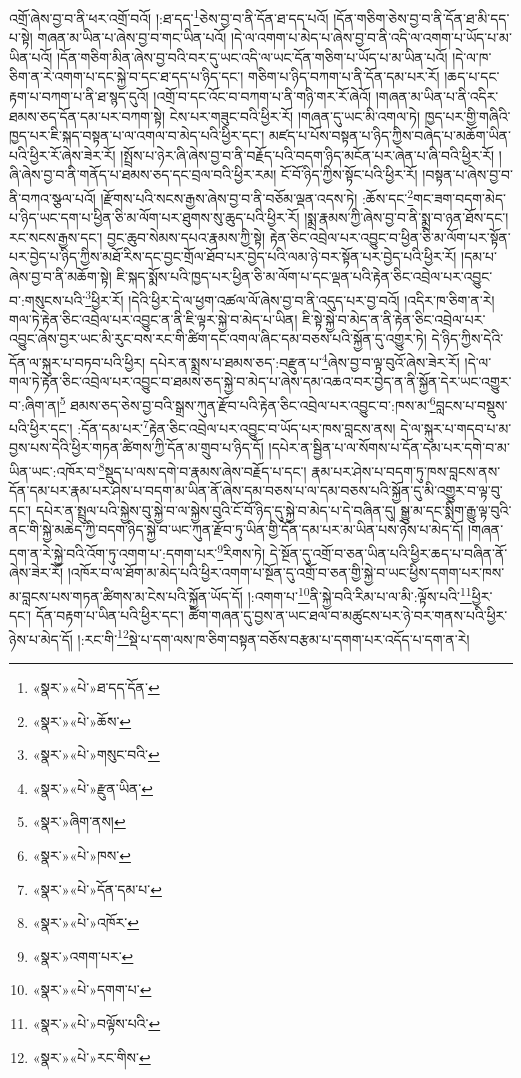འགྲོ་ཞེས་བྱ་བ་ནི་ཕར་འགྲོ་བའོ། །:ཐ་དད་\footnote{«སྣར་»«པེ་»ཐ་དད་དོན་}ཅེས་བྱ་བ་ནི་དོན་ཐ་དད་པའོ། །དོན་གཅིག་ཅེས་བྱ་བ་ནི་དོན་ཐ་མི་དད་པ་སྟེ། གཞན་མ་ཡིན་པ་ཞེས་བྱ་བ་གང་ཡིན་པའོ། །དེ་ལ་འགག་པ་མེད་པ་ཞེས་བྱ་བ་ནི་འདི་ལ་འགག་པ་ཡོད་པ་མ་ཡིན་པའོ། །དོན་གཅིག་མིན་ཞེས་བྱ་བའི་བར་དུ་ཡང་འདི་ལ་ཡང་དོན་གཅིག་པ་ཡོད་པ་མ་ཡིན་པའོ། །དེ་ལ་ཁ་ཅིག་ན་རེ་འགག་པ་དང་སྐྱེ་བ་དང་ཐ་དད་པ་ཉིད་དང་། གཅིག་པ་ཉིད་བཀག་པ་ནི་དོན་དམ་པར་རོ། །ཆད་པ་དང་རྟག་པ་བཀག་པ་ནི་ཐ་སྙད་དུའོ། །འགྲོ་བ་དང་འོང་བ་བཀག་པ་ནི་གཉི་གར་རོ་ཞེའོ། །གཞན་མ་ཡིན་པ་ནི་འདིར་ཐམས་ཅད་དོན་དམ་པར་བཀག་སྟེ། ངེས་པར་གཟུང་བའི་ཕྱིར་རོ། །གཞན་དུ་ཡང་མི་འགལ་ཏེ། ཁྱད་པར་གྱི་གཞིའི་ཁྱད་པར་ཇི་སྐད་བསྟན་པ་ལ་འགལ་བ་མེད་པའི་ཕྱིར་དང་། མཛད་པ་པོས་བསྟན་པ་ཉིད་ཀྱིས་བཞེད་པ་མཆོག་ཡིན་པའི་ཕྱིར་རོ་ཞེས་ཟེར་རོ། །སྤྲོས་པ་ཉེར་ཞི་ཞེས་བྱ་བ་ནི་བརྗོད་པའི་བདག་ཉིད་མངོན་པར་ཞེན་པ་ཞི་བའི་ཕྱིར་རོ། །ཞི་ཞེས་བྱ་བ་ནི་གནོད་པ་ཐམས་ཅད་དང་བྲལ་བའི་ཕྱིར་རམ། ངོ་བོ་ཉིད་ཀྱིས་སྟོང་པའི་ཕྱིར་རོ། །བསྟན་པ་ཞེས་བྱ་བ་ནི་བཀའ་སྩལ་པའོ། །རྫོགས་པའི་སངས་རྒྱས་ཞེས་བྱ་བ་ནི་བཅོམ་ལྡན་འདས་ཏེ། :ཆོས་དང་\footnote{«སྣར་»«པེ་»ཆོས་}གང་ཟག་བདག་མེད་པ་ཉིད་ཡང་དག་པ་ཕྱིན་ཅི་མ་ལོག་པར་ཐུགས་སུ་ཆུད་པའི་ཕྱིར་རོ། །སྨྲ་རྣམས་ཀྱི་ཞེས་བྱ་བ་ནི་སྨྲ་བ་ཉན་ཐོས་དང་། རང་སངས་རྒྱས་དང་། བྱང་ཆུབ་སེམས་དཔའ་རྣམས་ཀྱི་སྟེ། རྟེན་ཅིང་འབྲེལ་པར་འབྱུང་བ་ཕྱིན་ཅི་མ་ལོག་པར་སྟོན་པར་བྱེད་པ་ཉིད་ཀྱིས་མཐོ་རིས་དང་བྱང་གྲོལ་ཐོབ་པར་བྱེད་པའི་ལམ་ཉེ་བར་སྟོན་པར་བྱེད་པའི་ཕྱིར་རོ། །དམ་པ་ཞེས་བྱ་བ་ནི་མཆོག་སྟེ། ཇི་སྐད་སྨོས་པའི་ཁྱད་པར་ཕྱིན་ཅི་མ་ལོག་པ་དང་ལྡན་པའི་རྟེན་ཅིང་འབྲེལ་པར་འབྱུང་བ་:གསུངས་པའི་\footnote{«སྣར་»«པེ་»གསུང་བའི་}ཕྱིར་རོ། །དེའི་ཕྱིར་དེ་ལ་ཕྱག་འཚལ་ལོ་ཞེས་བྱ་བ་ནི་འདུད་པར་བྱ་བའོ། །འདིར་ཁ་ཅིག་ན་རེ། གལ་ཏེ་རྟེན་ཅིང་འབྲེལ་པར་འབྱུང་ན་ནི་ཇི་ལྟར་སྐྱེ་བ་མེད་པ་ཡིན། ཇི་སྟེ་སྐྱེ་བ་མེད་ན་ནི་རྟེན་ཅིང་འབྲེལ་པར་འབྱུང་ཞེས་བྱར་ཡང་མི་རུང་བས་རང་གི་ཚིག་དང་འགལ་ཞིང་དམ་བཅས་པའི་སྐྱོན་དུ་འགྱུར་ཏེ། དེ་ཉིད་ཀྱིས་དེའི་དོན་ལ་སྐུར་པ་བཏབ་པའི་ཕྱིར། དཔེར་ན་སྨྲས་པ་ཐམས་ཅད་:བརྫུན་པ་\footnote{«སྣར་»«པེ་»རྫུན་ཡིན་}ཞེས་བྱ་བ་ལྟ་བུའོ་ཞེས་ཟེར་རོ། །དེ་ལ་གལ་ཏེ་རྟེན་ཅིང་འབྲེལ་པར་འབྱུང་བ་ཐམས་ཅད་སྐྱེ་བ་མེད་པ་ཞེས་དམ་འཆའ་བར་བྱེད་ན་ནི་སྐྱོན་དེར་ཡང་འགྱུར་བ་:ཞིག་ན།\footnote{«སྣར་»ཞིག་ནས།} ཐམས་ཅད་ཅེས་བྱ་བའི་སྒྲས་ཀུན་རྫོབ་པའི་རྟེན་ཅིང་འབྲེལ་པར་འབྱུང་བ་:ཁས་མ་\footnote{«སྣར་»«པེ་»ཁས་}བླངས་པ་བསྡུས་པའི་ཕྱིར་དང་། :དོན་དམ་པར་\footnote{«སྣར་»«པེ་»དོན་དམ་པ་}རྟེན་ཅིང་འབྲེལ་པར་འབྱུང་བ་ཡོད་པར་ཁས་བླངས་ནས། དེ་ལ་སྐུར་པ་གདབ་པ་མ་བྱས་པས་དེའི་ཕྱིར་གཏན་ཚིགས་ཀྱི་དོན་མ་གྲུབ་པ་ཉིད་དོ། །དཔེར་ན་སྦྱིན་པ་ལ་སོགས་པ་དོན་དམ་པར་དགེ་བ་མ་ཡིན་ཡང་:འཁོར་བ་\footnote{«སྣར་»«པེ་»འཁོར་}སྡུད་པ་ལས་དགེ་བ་རྣམས་ཞེས་བརྗོད་པ་དང་། རྣམ་པར་ཤེས་པ་བདག་ཏུ་ཁས་བླངས་ནས་དོན་དམ་པར་རྣམ་པར་ཤེས་པ་བདག་མ་ཡིན་ནོ་ཞེས་དམ་བཅས་པ་ལ་དམ་བཅས་པའི་སྐྱོན་དུ་མི་འགྱུར་བ་ལྟ་བུ་དང་། དཔེར་ན་སྤྲུལ་པའི་སྐྱེས་བུ་སྐྱེ་བ་ལ་སྐྱེས་བུའི་ངོ་བོ་ཉིད་དུ་སྐྱེ་བ་མེད་པ་དེ་བཞིན་དུ། སྒྱུ་མ་དང་སྨིག་རྒྱུ་ལྟ་བུའི་ནང་གི་སྐྱེ་མཆེད་ཀྱི་བདག་ཉིད་སྐྱེ་བ་ཡང་ཀུན་རྫོབ་ཏུ་ཡིན་གྱི་དོན་དམ་པར་མ་ཡིན་པས་ཉེས་པ་མེད་དོ། །གཞན་དག་ན་རེ་སྐྱེ་བའི་འོག་ཏུ་འགག་པ་:དགག་པར་\footnote{«སྣར་»འགག་པར་}རིགས་ཏེ། དེ་སྔོན་དུ་འགྲོ་བ་ཅན་ཡིན་པའི་ཕྱིར་ཆད་པ་བཞིན་ནོ་ཞེས་ཟེར་རོ། །འཁོར་བ་ལ་ཐོག་མ་མེད་པའི་ཕྱིར་འགག་པ་སྔོན་དུ་འགྲོ་བ་ཅན་གྱི་སྐྱེ་བ་ཡང་ཕྱིས་དགག་པར་ཁས་མ་བླངས་པས་གཏན་ཚིགས་མ་ངེས་པའི་སྐྱོན་ཡོད་དོ། །:འགག་པ་\footnote{«སྣར་»«པེ་»དགག་པ་}ནི་སྐྱེ་བའི་རིམ་པ་ལ་མི་:ལྟོས་པའི་\footnote{«སྣར་»«པེ་»བལྟོས་པའི་}ཕྱིར་དང་། དོན་བརྟག་པ་ཡིན་པའི་ཕྱིར་དང་། ཚིག་གཞན་དུ་བྱས་ན་ཡང་ཐལ་བ་མཚུངས་པར་ཉེ་བར་གནས་པའི་ཕྱིར་ཉེས་པ་མེད་དོ། །:རང་གི་\footnote{«སྣར་»«པེ་»རང་གིས་}སྡེ་པ་དག་ལས་ཁ་ཅིག་བསྟན་བཅོས་བརྩམ་པ་དགག་པར་འདོད་པ་དག་ན་རེ། 